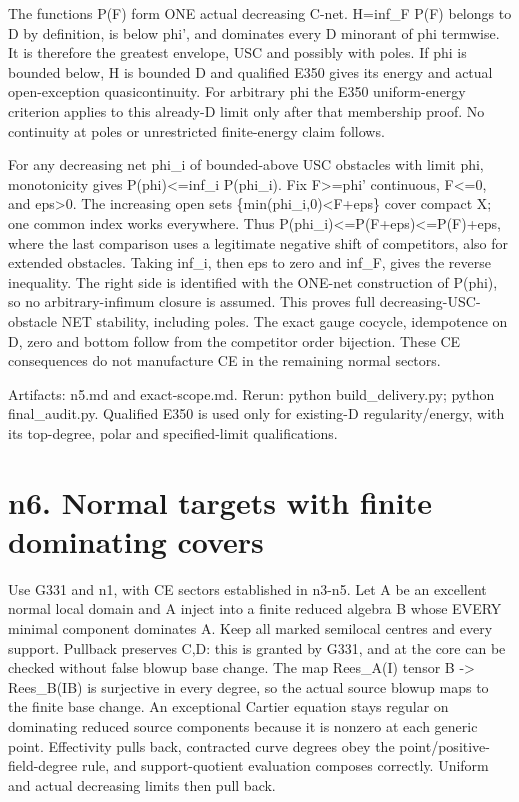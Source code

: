 \documentclass[11pt]{article}
\begin{document}
The functions P(F) form ONE actual decreasing C-net. H=inf\_F P(F) belongs to D by definition, is below phi', and dominates every D minorant of phi termwise. It is therefore the greatest envelope, USC and possibly with poles. If phi is bounded below, H is bounded D and qualified E350 gives its energy and actual open-exception quasicontinuity. For arbitrary phi the E350 uniform-energy criterion applies to this already-D limit only after that membership proof. No continuity at poles or unrestricted finite-energy claim follows.

For any decreasing net phi\_i of bounded-above USC obstacles with limit phi, monotonicity gives P(phi)<=inf\_i P(phi\_i). Fix F>=phi' continuous, F<=0, and eps>0. The increasing open sets \{min(phi\_i,0)<F+eps\} cover compact X; one common index works everywhere. Thus P(phi\_i)<=P(F+eps)<=P(F)+eps, where the last comparison uses a legitimate negative shift of competitors, also for extended obstacles. Taking inf\_i, then eps to zero and inf\_F, gives the reverse inequality. The right side is identified with the ONE-net construction of P(phi), so no arbitrary-infimum closure is assumed. This proves full decreasing-USC-obstacle NET stability, including poles. The exact gauge cocycle, idempotence on D, zero and bottom follow from the competitor order bijection. These CE consequences do not manufacture CE in the remaining normal sectors.

Artifacts: n5.md and exact-scope.md. Rerun: python build\_delivery.py; python final\_audit.py. Qualified E350 is used only for existing-D regularity/energy, with its top-degree, polar and specified-limit qualifications.


\section*{n6. Normal targets with finite dominating covers}

Use G331 and n1, with CE sectors established in n3-n5. Let A be an excellent normal local domain and A inject into a finite reduced algebra B whose EVERY minimal component dominates A. Keep all marked semilocal centres and every support. Pullback preserves C,D: this is granted by G331, and at the core can be checked without false blowup base change. The map Rees\_A(I) tensor B -> Rees\_B(IB) is surjective in every degree, so the actual source blowup maps to the finite base change. An exceptional Cartier equation stays regular on dominating reduced source components because it is nonzero at each generic point. Effectivity pulls back, contracted curve degrees obey the point/positive-field-degree rule, and support-quotient evaluation composes correctly. Uniform and actual decreasing limits then pull back.
\end{document}
